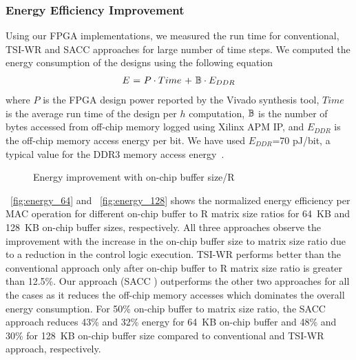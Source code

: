 {{{\subsubsection{Energy Efficiency Improvement}
Using our FPGA implementations, we measured the run time for conventional, TSI-WR and SACC approaches for large number of time steps. We computed the energy consumption of the designs using the following equation~\cite{tu2017deep}
\begin{align}\label{eq:energyEfficiency}
	E~{=}~P\cdot Time~{+}~\mathbb{B}\cdot E_{DDR}
\end{align}
where $P$ is the FPGA design power reported by the Vivado synthesis tool, $Time$ is the average run time of the design per $h$ computation, $\mathbb{B}$ is the number of bytes accessed from off-chip memory logged using Xilinx APM IP, and $E_{DDR}$ is the off-chip memory access energy per bit. We have used $E_{DDR}$=70 pJ/bit, a typical value for the DDR3 memory access energy~\cite{6237004}.
\begin{figure}[htb!]
	\centering
	\hspace{2.0em}
	\caption{Energy improvement with on-chip buffer size/R}\label{fig:energyVsMem}
\end{figure}
\figurename{~\ref{fig:energy_64}} and \figurename{~\ref{fig:energy_128}} shows the normalized energy efficiency per MAC operation for different on-chip buffer to R matrix size ratios for 64~KB and 128~KB on-chip buffer sizes, respectively.  All three approaches observe the improvement with the increase in the on-chip buffer size to matrix size ratio due to a reduction in the control logic execution. TSI-WR performs better than the conventional approach only after on-chip buffer to R matrix size ratio is greater than 12.5\%. Our approach (SACC ) outperforms the other two approaches for all the cases as it reduces the off-chip memory accesses which dominates the overall energy consumption. For 50\% on-chip buffer to matrix size ratio, the SACC approach reduces 43\% and 32\% energy for 64~KB on-chip buffer and 48\% and 30\% for 128~KB on-chip buffer size compared to conventional and TSI-WR approach, respectively.

}}}
